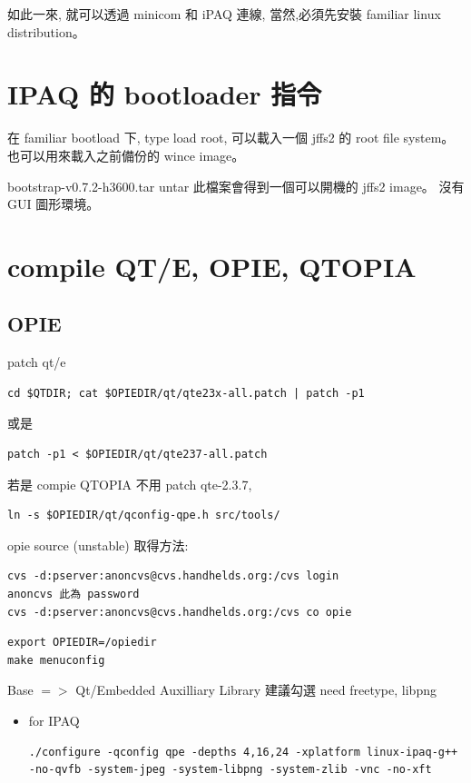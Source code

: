\documentclass[12pt,a4paper]{article}
\begin{document}
\begin{CJK}{UTF8}{bsmi}
如此一來, 就可以透過 minicom 和 iPAQ 連線,
當然,必須先安裝 familiar linux distribution。

\section{IPAQ 的 bootloader 指令}

在 familiar bootload 下, type
load root,
可以載入一個 jffs2 的 root file system。
也可以用來載入之前備份的 wince image。


bootstrap-v0.7.2-h3600.tar untar 此檔案會得到一個可以開機的 jffs2 image。
沒有 GUI 圖形環境。

\section{compile QT/E, OPIE, QTOPIA}
\subsection{OPIE}
patch qt/e
\begin{verbatim}
cd $QTDIR; cat $OPIEDIR/qt/qte23x-all.patch | patch -p1
\end{verbatim}

或是

\begin{verbatim}
patch -p1 < $OPIEDIR/qt/qte237-all.patch 
\end{verbatim}

若是 compie QTOPIA 不用 patch qte-2.3.7,
\begin{verbatim}
ln -s $OPIEDIR/qt/qconfig-qpe.h src/tools/
\end{verbatim}

opie source (unstable) 取得方法:\\
\begin{verbatim}
cvs -d:pserver:anoncvs@cvs.handhelds.org:/cvs login
anoncvs 此為 password
cvs -d:pserver:anoncvs@cvs.handhelds.org:/cvs co opie
\end{verbatim}

\begin{verbatim}
export OPIEDIR=/opiedir
make menuconfig
\end{verbatim}
Base $=>$ Qt/Embedded Auxilliary Library
建議勾選
need freetype, libpng

\begin{itemize}

\item for IPAQ

\begin{verbatim}
./configure -qconfig qpe -depths 4,16,24 -xplatform linux-ipaq-g++ -no-qvfb -system-jpeg -system-libpng -system-zlib -vnc -no-xft
\end{verbatim}


\end{itemize}
\end{CJK}
\end{document}
